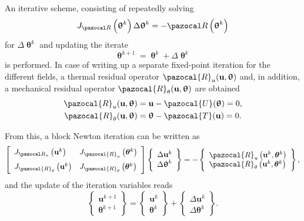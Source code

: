 An iterative scheme, consisting of repeatedly solving
\begin{equation} \label{eq:newton_raphson}
J_{\pazocal R}\left(\bm \uptheta^{k}\right) \Delta \bm \uptheta^{k}=-\pazocal R\left(\bm \uptheta^{k}\right)
\end{equation}
for $\Delta \bm \uptheta^{k}$ and updating the iterate
\begin{equation}
\bm \uptheta^{k+1}= \bm \uptheta^{k}+\Delta \bm \uptheta^{k}
\end{equation}
is performed.
In case of writing up a separate fixed-point iteration for the different fields, a thermal residual operator $\pazocal{R}_{u}(\mathbf{u}, \bm{\uptheta})$ and, in addition, a mechanical residual operator $\pazocal{R}_{\theta}(\mathbf{u}, \bm{\uptheta})$ are obtained
\begin{gather}
\pazocal{R}_{u}(\mathbf{u}, \bm{\uptheta})=\mathbf{u}-\pazocal{U}(\bm{\uptheta})=0, \\
\pazocal{R}_{\theta}(\mathbf{u}, \bm{\uptheta})=\bm{\uptheta}-\pazocal{T}(\mathbf{u})=0.
\end{gather}

From this, a block Newton iteration can be written as
\begin{equation} \label{eq:block_newton_raphson}
\left[\begin{array}{ll}J_{\pazocal R_{u}}\left(\mathbf{u}^{k}\right) & J_{\pazocal{R}_{u}}\left(\boldsymbol{\theta}^{k}\right) \\[7pt] J_{\pazocal{R}_{\theta}}\left(\mathbf{u}^{k}\right) & J_{\pazocal{R}_{\theta}}\left(\boldsymbol{\theta}^{k}\right)\end{array}\right]
\left\{\begin{array}{c}\Delta \mathbf{u}^{k} \\ \Delta \bm{\uptheta}^{k}\end{array}\right\}
=-\left\{\begin{array}{l}\pazocal{R}_{u}\left(\mathbf{u}^{k}, \boldsymbol{\theta}^{k}\right) \\ \pazocal{R}_{\theta}\left(\mathbf{u}^{k}, \boldsymbol{\theta}^{k}\right)\end{array}\right\},
\end{equation}
and the update of the iteration variables reads
\begin{equation}
\left\{\begin{array}{l}
\mathbf{u}^{k+1} \\
\boldsymbol{\theta}^{k+1}
\end{array}\right\}=\left\{\begin{array}{l}
\mathbf{u}^{k} \\
\boldsymbol{\theta}^{k}
\end{array}\right\}+\left\{\begin{array}{c}
\Delta \mathbf{u}^{k} \\
\Delta \boldsymbol{\theta}^{k}
\end{array}\right\}.
\end{equation}

